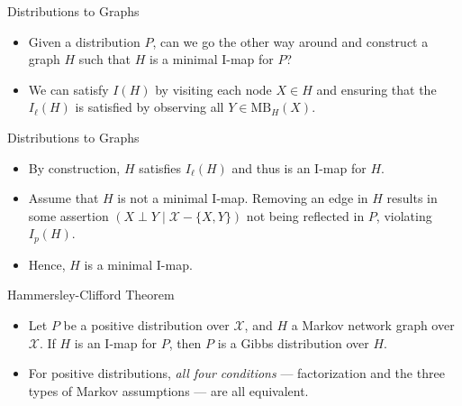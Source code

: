 \documentclass[11pt]{beamer}
\begin{document}

\begin{frame}{Distributions to Graphs}
\begin{itemize}
	\item Given a distribution $P$, can we go the other way around and
	construct a graph $H$ such that $H$ is a minimal I-map for $P$?
	\item We can satisfy $I(H)$ by visiting each node $X \in H$ and ensuring
	that the $I_{\ell}(H)$ is satisfied by observing all $Y \in
	\text{MB}_{H}(X)$.
\end{itemize}
\end{frame}

\begin{frame}{Distributions to Graphs}
\begin{itemize}
	\item By construction, $H$ satisfies $I_{\ell}(H)$ and thus is an I-map
	for $H$.
	\item Assume that $H$ is not a minimal I-map. Removing an edge in $H$
	results in some assertion $(X \perp Y \;|\; \mathcal{X} - \{X,Y\})$ not
	being reflected in $P$, violating $I_{p}(H)$.
	\item Hence, $H$ is a minimal I-map.
\end{itemize}
\end{frame}

\begin{frame}{Hammersley-Clifford Theorem}
\begin{itemize}
	\item Let $P$ be a positive distribution over $\mathcal{X}$, and $H$ a
	Markov network graph over $\mathcal{X}$. If $H$ is an I-map for $P$,
	then $P$ is a Gibbs distribution over $H$.
	\item For positive distributions, \emph{all four conditions} ---
	factorization and the three types of Markov assumptions --- are all
	equivalent.
\end{itemize}
\end{frame}
\end{document}
